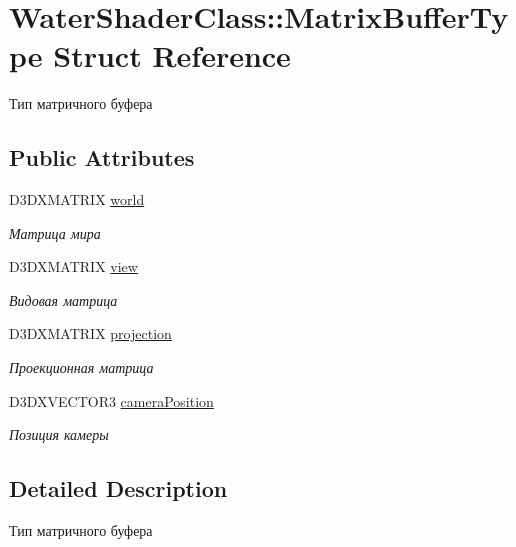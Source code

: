 \hypertarget{struct_water_shader_class_1_1_matrix_buffer_type}{}\section{Water\+Shader\+Class\+:\+:Matrix\+Buffer\+Type Struct Reference}
\label{struct_water_shader_class_1_1_matrix_buffer_type}


Тип матричного буфера  


\subsection*{Public Attributes}
\begin{DoxyCompactItemize}
\item 
D3\+D\+X\+M\+A\+T\+R\+IX \hyperlink{struct_water_shader_class_1_1_matrix_buffer_type_a3d9e9c1b1d805ed195a92dbf0555b9fc}{world}
\begin{DoxyCompactList}\small\item\em Матрица мира \end{DoxyCompactList}\item 
D3\+D\+X\+M\+A\+T\+R\+IX \hyperlink{struct_water_shader_class_1_1_matrix_buffer_type_ad821f27bb9f2d0b90315e79c7f194ec9}{view}
\begin{DoxyCompactList}\small\item\em Видовая матрица \end{DoxyCompactList}\item 
D3\+D\+X\+M\+A\+T\+R\+IX \hyperlink{struct_water_shader_class_1_1_matrix_buffer_type_ac280d74b67a0fb374bf6e3b3a1264428}{projection}
\begin{DoxyCompactList}\small\item\em Проекционная матрица \end{DoxyCompactList}\item 
D3\+D\+X\+V\+E\+C\+T\+O\+R3 \hyperlink{struct_water_shader_class_1_1_matrix_buffer_type_aeb9e1c3c9268ab095485071cb89a7248}{camera\+Position}
\begin{DoxyCompactList}\small\item\em Позиция камеры \end{DoxyCompactList}\end{DoxyCompactItemize}


\subsection{Detailed Description}
Тип матричного буфера 

